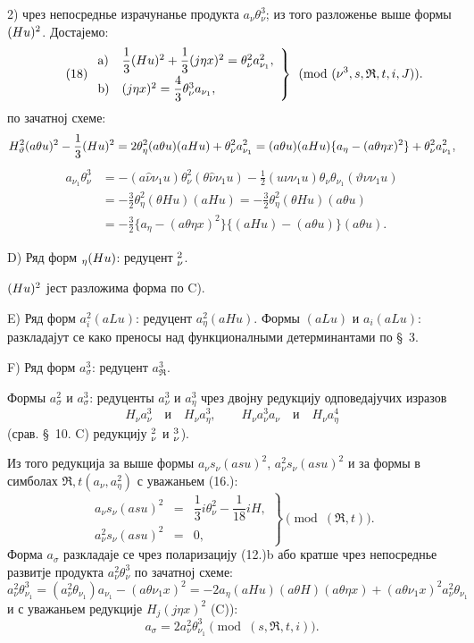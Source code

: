 ﻿\documentclass[11pt]{article}
\let\A\relax
\newcommand{\A}{\mathfrak A}
\newcommand{\R}{\mathfrak R}
\begin{document}
2) чрез непосреднье израчунанье продукта $a_\nu\theta_\nu^3$; из того разложенье выше формы $(\A Hu)^2$. Достајемо:
\[
\tag{18}
\left.\begin{array}{ll}
\mathrm{a)}&\dfrac13(\A Hu)^2+\dfrac13(j\eta x)^2=\theta_\nu^2a_{\nu_1}^2,\\[0.6em]
\mathrm{b)}&(j\eta x)^2=\dfrac43\theta_\nu^3a_{\nu_1},
\end{array}\right\}\pmod{(\nu^3,s,\R,t,i,J)}.
\]
по зачатној схеме:
\[
H_\vartheta^2(a\theta u)^2-\frac13(\A Hu)^2
=2\theta_\eta^2(a\theta u)(aHu)+\theta_\nu^2a_{\nu_1}^2
=(a\theta u)(aHu)\{a_\eta-(a\theta\eta x)^2\}+\theta_\nu^2a_{\nu_1}^2,
\]
\[
\begin{aligned}
a_{\nu_1}\theta_\nu^3
&=-(a\widehat{\nu}\nu_1u)\theta_\nu^2(\theta\widehat{\nu}\nu_1u)
-\frac12(u\nu\nu_1u)\theta_\nu\theta_{\nu_1}(\vartheta\nu\nu_1u)\\
&=-\frac32\theta_\eta^2(\theta Hu)(aHu)
=-\frac32\theta_\eta^2(\theta Hu)(a\theta u)\\
&=-\frac32\{a_\eta-(a\theta\eta x)^2\}\{(aHu)-(a\theta u)\}(a\theta u).
\end{aligned}
\]

\noindent\mbox{D)} Ряд форм $\A_\eta(\A Hu)$: редуцент $\A_\nu^2$.

$(\A Hu)^2$ јест разложима форма по \mbox{C)}.

\noindent\mbox{E)} Ряд форм $a_i^2(aLu)$: редуцент $a_\eta^2(aHu)$. Формы $(aLu)$ и $a_i(aLu)$: разкладајут се како преносы над функционалными детерминантами по \S\ 3.

\noindent\mbox{F)} Ряд форм $a_\sigma^3$: редуцент $a_\R^3$.

Формы $a_\sigma^2$ и $a_\sigma^3$: редуценты $a_\nu^3$ и $a_\eta^3$ чрез двојну редукцију одповедајучих изразов
\[
H_\nu a_\nu^3\quad\text{и}\quad H_\nu a_\eta^3,
\qquad
H_\nu a_\nu^3a_\nu\quad\text{и}\quad H_\nu a_\eta^4
\]
(срав. \S\ 10. \mbox{C)} редукцију $\A_\nu^2$ и $\A_\nu^3$).

Из того редукција за выше формы $a_\nu s_\nu(asu)^2$, $a_\nu^2s_\nu(asu)^2$ и за формы в симболах $\R,t(a_\nu,a_\eta^2)$ с уважаньем (16.):
\[
\tag{19}
\left.\begin{array}{rcl}
a_\nu s_\nu(asu)^2&=&\dfrac13 i\theta_\nu^2-\dfrac1{18}iH,\\[0.5em]
a_\nu^2s_\nu(asu)^2&=&0,
\end{array}\right\}\pmod{(\R,t)}.
\]
Форма $a_\sigma$ разкладаје се чрез поларизацију (12.)\mbox{b} або кратше чрез непосреднье развитје продукта $a_\nu^2\theta_\nu^3$ по зачатној схеме:
\[
a_\nu^2\theta_{\nu_1}^3=(a_\nu^2\theta_{\nu_1})a_{\nu_1}-(a\theta\nu_1x)^2
=-2a_\eta(aHu)(a\theta H)(a\theta\eta x)+(a\theta\nu_1x)^2a_\nu^2\theta_{\nu_1}
\]
и с уважаньем редукције $H_j(j\eta x)^2$ (\mbox{C)}):
\[
\tag{20}
a_\sigma=2a_\nu^2\theta_{\nu_1}^3\pmod{(s,\R,t,i)}.
\]
\end{document}
